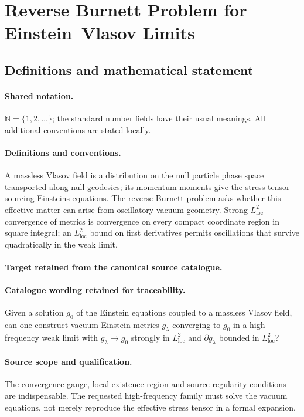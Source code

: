 \documentclass[11pt]{article}
\begin{document}
\section{Reverse Burnett Problem for Einstein–Vlasov Limits}\label{statement}

\subsection{Definitions and mathematical statement}

\paragraph{Shared notation.}$\mathbb N=\{1,2,\ldots\}$; the standard number fields have their usual meanings. All additional conventions are stated locally.


\paragraph{Definitions and conventions.}
A massless Vlasov field is a distribution on the null particle phase space transported along null geodesics; its momentum moments give the stress tensor sourcing Einstein\textquotesingle s equations. The reverse Burnett problem asks whether this effective matter can arise from oscillatory vacuum geometry. Strong $L^2_{\mathrm{loc}}$ convergence of metrics is convergence on every compact coordinate region in square integral; an $L^2_{\mathrm{loc}}$ bound on first derivatives permits oscillations that survive quadratically in the weak limit.

\paragraph{Target retained from the canonical source catalogue.}
\paragraph{Catalogue wording retained for traceability.}
Given a solution $g_0$ of the Einstein equations coupled to a massless Vlasov field, can one construct vacuum Einstein metrics $g_\lambda$ converging to $g_0$ in a high-frequency weak limit with $g_\lambda\to g_0$ strongly in $L^2_{\mathrm{loc}}$ and $\partial g_\lambda$ bounded in $L^2_{\mathrm{loc}}$?

\paragraph{Source scope and qualification.}
The convergence gauge, local existence region and source regularity conditions are indispensable. The requested high-frequency family must solve the vacuum equations, not merely reproduce the effective stress tensor in a formal expansion.
\end{document}
